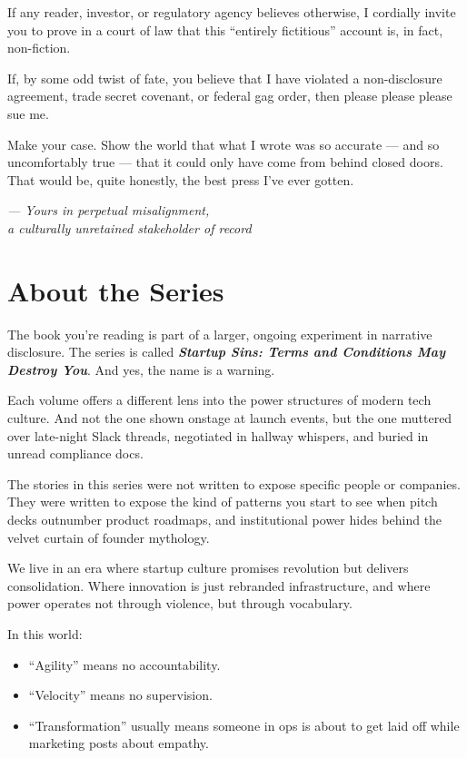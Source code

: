 \documentclass{article}
\begin{document}
  If any reader, investor, or regulatory agency believes otherwise, I cordially invite you to prove 
  in a court of law that this ``entirely fictitious'' account is, in fact, non-fiction.

  
  If, by some odd twist of fate, you believe that I have violated a non-disclosure agreement, 
  trade secret covenant, or federal gag order, then please please please sue me.

  Make your case. Show the world that what I wrote was so accurate --- and so uncomfortably true --- 
  that it could only have come from behind closed doors. That would be, quite honestly, the best press 
  I’ve ever gotten.
  
  \begin{flushright}
    \textit{— Yours in perpetual misalignment,}\\
    \textit{a culturally unretained stakeholder of record}
    \end{flushright}

  \section*{About the Series}

  The book you're reading is part of a larger, ongoing experiment in narrative disclosure.  
  The series is called \textbf{\textit{Startup Sins: Terms and Conditions May Destroy You}}. And yes, 
  the name is a warning.
  
  Each volume offers a different lens into the power structures of modern tech culture. And not the 
  one shown onstage at launch events, but the one muttered over late-night Slack threads, negotiated in 
  hallway whispers, and buried in unread compliance docs.
  
  The stories in this series were not written to expose specific people or companies.  
  They were written to expose the kind of patterns you start to see when pitch decks outnumber 
  product roadmaps, and institutional power hides behind the velvet curtain of founder mythology.
  
  We live in an era where startup culture promises revolution but delivers consolidation.
  Where innovation is just rebranded infrastructure, and where power operates not through violence, 
  but through vocabulary.
  
  In this world:
  
  \begin{itemize}
    \item ``Agility'' means no accountability.
    \item ``Velocity'' means no supervision.
    \item ``Transformation'' usually means someone in ops is about to get laid off while marketing posts about empathy.
  \end{itemize}
  
\end{document}

